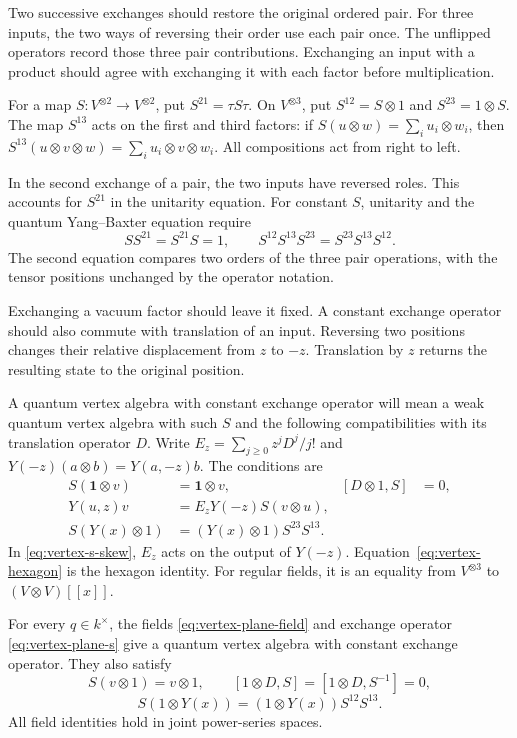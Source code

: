 Two successive exchanges should restore the original ordered pair.
For three inputs, the two ways of reversing their order use
each pair once.
The unflipped operators record those three pair contributions.
Exchanging an input with a product should agree with exchanging it
with each factor before multiplication.

For a map $S:V^{\otimes2}\to V^{\otimes2}$, put
$S^{21}=\tau S\tau$.
On $V^{\otimes3}$, put $S^{12}=S\otimes1$ and $S^{23}=1\otimes S$.
The map $S^{13}$ acts on the first and third factors:
if $S(u\otimes w)=\sum_i u_i\otimes w_i$, then
$S^{13}(u\otimes v\otimes w)=\sum_i u_i\otimes v\otimes w_i$.
All compositions act from right to left.

In the second exchange of a pair, the two inputs have reversed roles.
This accounts for $S^{21}$ in the unitarity equation.
For constant $S$, unitarity and the quantum Yang--Baxter equation require
\begin{equation}\label{eq:vertex-unitarity-yb}
 SS^{21}=S^{21}S=1,\qquad
 S^{12}S^{13}S^{23}=S^{23}S^{13}S^{12}.
\end{equation}
The second equation compares two orders of the three pair operations,
with the tensor positions unchanged by the operator notation.

Exchanging a vacuum factor should leave it fixed.
A constant exchange operator should also commute with translation of an input.
Reversing two positions changes their relative displacement from $z$ to $-z$.
Translation by $z$ returns the resulting state to the original position.

A quantum vertex algebra with constant exchange operator will mean
a weak quantum vertex algebra with such $S$ and the following
compatibilities with its translation operator $D$.
Write $E_z=\sum_{j\geq0}z^jD^j/j!$ and
$Y(-z)(a\otimes b)=Y(a,-z)b$.
The conditions are
\begin{align}
 S(\mathbf1\otimes v)&=\mathbf1\otimes v,
 & [D\otimes1,S]&=0,
 \label{eq:vertex-vacuum-shift}\\
 Y(u,z)v&=E_zY(-z)S(v\otimes u),
 \label{eq:vertex-s-skew}\\
 S(Y(x)\otimes1)&=(Y(x)\otimes1)S^{23}S^{13}.
 \label{eq:vertex-hexagon}
\end{align}
In \eqref{eq:vertex-s-skew}, $E_z$ acts on the output of $Y(-z)$.
Equation~\eqref{eq:vertex-hexagon} is the hexagon identity.
For regular fields, it is an equality from $V^{\otimes3}$ to
$(V\otimes V)[[x]]$.

\begin{theorem}\label{thm:vertex-quantum-plane}
For every $q\in k^\times$, the fields \eqref{eq:vertex-plane-field}
and exchange operator \eqref{eq:vertex-plane-s} give a quantum vertex
algebra with constant exchange operator.
They also satisfy
\[
 S(v\otimes1)=v\otimes1,\qquad
 [1\otimes D,S]=[1\otimes D,S^{-1}]=0,
\]
\[
 S(1\otimes Y(x))=(1\otimes Y(x))S^{12}S^{13}.
\]
All field identities hold in joint power-series spaces.
\end{theorem}

